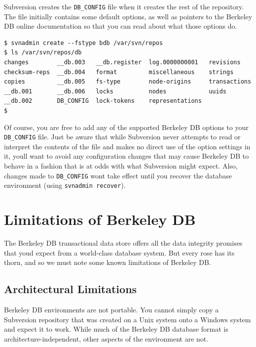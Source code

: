 Subversion creates the \texttt{DB\_CONFIG} file when it creates the rest
of the repository. The file initially contains some default options, as
well as pointers to the Berkeley DB online documentation so that you can
read about what those options do.

\begin{verbatim}
$ svnadmin create --fstype bdb /var/svn/repos
$ ls /var/svn/repos/db
changes        __db.003   __db.register  log.0000000001   revisions
checksum-reps  __db.004   format         miscellaneous    strings
copies         __db.005   fs-type        node-origins     transactions
__db.001       __db.006   locks          nodes            uuids
__db.002       DB_CONFIG  lock-tokens    representations
$
\end{verbatim}

Of course, you are free to add any of the supported Berkeley DB options
to your \texttt{DB\_CONFIG} file. Just be aware that while Subversion
never attempts to read or interpret the contents of the file and makes
no direct use of the option settings in it, you\textquotesingle ll want
to avoid any configuration changes that may cause Berkeley DB to behave
in a fashion that is at odds with what Subversion might expect. Also,
changes made to \texttt{DB\_CONFIG} won\textquotesingle t take effect
until you recover the database environment (using
\texttt{svnadmin\ recover}).

\section{Limitations of Berkeley DB}\label{svn.berkeleydb.limitations}

The Berkeley DB transactional data store offers all the data integrity
promises that you\textquotesingle d expect from a world-class database
system. But every rose has its thorn, and so we must note some known
limitations of Berkeley DB.

\subsection{Architectural
Limitations}\label{svn.berkeleydb.limitations.architectural}

Berkeley DB environments are not portable. You cannot simply copy a
Subversion repository that was created on a Unix system onto a Windows
system and expect it to work. While much of the Berkeley DB database
format is architecture-independent, other aspects of the environment are
not.

